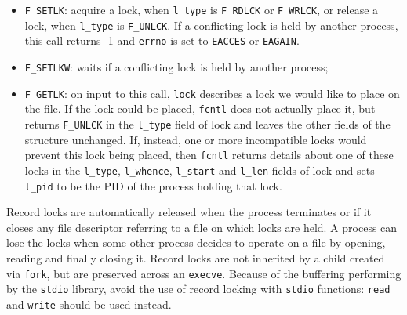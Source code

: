 \begin{itemize}
\item \texttt{F\_SETLK}: acquire a lock, when \texttt{l\_type} is \texttt{F\_RDLCK} or \texttt{F\_WRLCK}, or release a lock, when \texttt{l\_type} is \texttt{F\_UNLCK}. If a conflicting lock is held by another process, this call returns -1 and \texttt{errno} is set to \texttt{EACCES} or \texttt{EAGAIN}.
\item \texttt{F\_SETLKW}: waits if a conflicting lock is held by another process;
\item \texttt{F\_GETLK}: on input to this call, \texttt{lock} describes a lock we would like to place on the file. If the lock could be placed, \texttt{fcntl} does not actually place it, but returns \texttt{F\_UNLCK} in the \texttt{l\_type} field of lock and leaves the other fields of the structure unchanged. If, instead, one or more incompatible locks would prevent this lock being placed, then \texttt{fcntl} returns details about one of these locks in the \texttt{l\_type}, \texttt{l\_whence}, \texttt{l\_start} and \texttt{l\_len} fields of lock and sets \texttt{l\_pid} to be the PID of the process holding that lock.
\end{itemize}

Record locks are automatically released when the process terminates or if it closes any file descriptor referring to a file on which locks are held. A process can lose the locks when some other process decides to operate on a file by opening, reading and finally closing it. Record locks are not inherited by a child created via \texttt{fork}, but are preserved across an \texttt{execve}. Because of the buffering performing by the \texttt{stdio} library, avoid the use of record locking with \texttt{stdio} functions: \texttt{read} and \texttt{write} should be used instead.